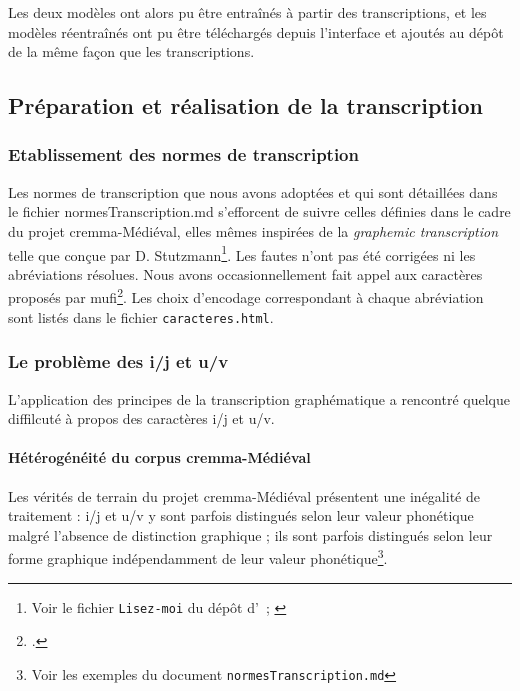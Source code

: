 \documentclass{article}
\newcommand\textvtt[1]{{\normalfont\fontfamily{cmvtt}\selectfont #1}}
\begin{document}
	Les deux modèles ont alors pu être entraînés à partir des transcriptions, et les modèles réentraînés ont pu être téléchargés depuis l’interface et ajoutés au dépôt de la même façon que les transcriptions.
	
	\subsection{Préparation et réalisation de la transcription}
	\subsubsection{Etablissement des normes de transcription}
	Les normes de transcription que nous avons adoptées et qui sont détaillées dans le fichier \textvtt{normesTranscription.md} s'efforcent de suivre celles définies dans le cadre du projet \gls{cremma}-Médiéval, elles mêmes inspirées de la \textit{graphemic transcription} telle que conçue par D. Stutzmann\footnote{Voir le fichier \texttt{Lisez-moi} du dépôt d'\cite{pincheCREMMAMedievalOld2021}~; \cite{stutzmannPaleographieStatistiquePour2011}}. Les fautes n'ont pas été corrigées ni les abréviations résolues. Nous avons occasionnellement fait appel aux caractères proposés par \gls{mufi}\footcite{MedievalUnicodeFont2016}. Les choix d'encodage correspondant à chaque abréviation sont listés dans le fichier \texttt{caracteres.html}.
	
	\subsubsection{Le problème des i/j et u/v}
	L'application des principes de la transcription graphématique a rencontré quelque diffilcuté à propos des caractères i/j et u/v. 
	\paragraph{Hétérogénéité du corpus \gls{cremma}-Médiéval}
	Les vérités de terrain du projet \gls{cremma}-Médiéval présentent une inégalité de traitement : i/j et u/v y sont parfois distingués selon leur valeur phonétique malgré l'absence de distinction graphique ; ils sont parfois distingués selon leur forme graphique indépendamment de leur valeur phonétique\footnote{Voir les exemples du document \texttt{normesTranscription.md}}.
	
\end{document}
